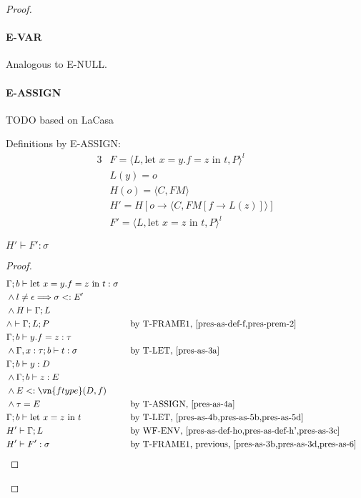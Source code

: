 \begin{proof}
\paragraph{E-VAR}
Analogous to E-NULL.

\paragraph{E-ASSIGN}
TODO based on LaCasa

Definitions by E-ASSIGN:
\begin{alignat}{3}
    &F = \langle L, \text{let } x = y.f = z \text{ in } t, P \rangle^l \label{pres-as-def-f}\\
    &L(y) = o \label{pres-as-def-ly}\\
    &H(o) = \langle C, FM \rangle \label{pres-as-def-ho}\\
    &H' = H[o \rightarrow \langle C, FM[f \rightarrow L(z)]\rangle] \label{pres-as-def-h'}\\
    &F' = \langle L, \text{let } x = z \text{ in } t, P \rangle^l \label{pres-as-def-f'}
\end{alignat}

$H' \vdash F' : \sigma$
\begin{proof}
\begin{alignat}{3}
    &\Gamma; b \vdash \text{let } x = y.f = z \text{ in } t : \sigma \label{pres-as-3a}\\
    &\wedge l \neq \epsilon \Longrightarrow \sigma <: E' \label{pres-as-3b}\\
    &\wedge H \vdash \Gamma; L \label{pres-as-3c}\\
    &\wedge \vdash \Gamma; L; P \label{pres-as-3d}
        && \text{ by T-FRAME1, \cref{pres-as-def-f,pres-prem-2}}\\
    &\Gamma; b \vdash y.f = z : \tau \label{pres-as-4a}\\
    &\wedge \Gamma, x : \tau; b \vdash t : \sigma \label{pres-as-4b}
        && \text{ by T-LET, \cref{pres-as-3a}}\\
    &\Gamma; b \vdash y : D \label{pres-as-5a}\\
    &\wedge \Gamma; b \vdash z : E \label{pres-as-5b}\\
    &\wedge E <: \vn{ftype}(D, f) \label{pres-as-5c}\\
    &\wedge \tau = E \label{pres-as-5d}
        && \text{ by T-ASSIGN, \cref{pres-as-4a}}\\
    &\Gamma; b \vdash \text{let } x = z \text{ in } t \label{pres-as-6}
        && \text{ by T-LET, \cref{pres-as-4b,pres-as-5b,pres-as-5d}}\\
    &H' \vdash \Gamma; L
        && \text{ by WF-ENV, \cref{pres-as-def-ho,pres-as-def-h',pres-as-3c}}\\
    &H' \vdash F' : \sigma
        && \text{ by T-FRAME1, previous, \cref{pres-as-3b,pres-as-3d,pres-as-6}}\\
\end{alignat}
\end{proof}


\end{proof}
